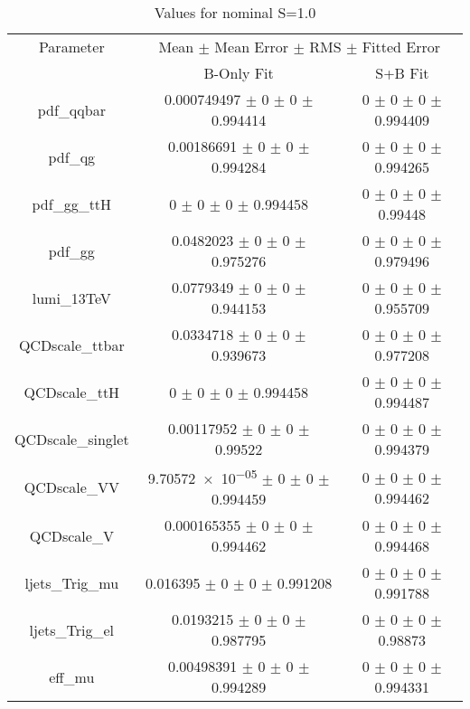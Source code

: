 \begin{table}
\centering
\caption{Values for nominal S=1.0}
\begin{tabular}{ccc}
\toprule
Parameter & \multicolumn{2}{c}{Mean $\pm$ Mean Error $\pm$ RMS $\pm$ Fitted Error}\\
 & B-Only Fit & S+B Fit\\
\midrule
pdf\_qqbar & \num{0.000749497} $\pm$ \num{0} $\pm$ \num{0} $\pm$ \num{0.994414} & \num{0} $\pm$ \num{0} $\pm$ \num{0} $\pm$ \num{0.994409}\\
pdf\_qg & \num{0.00186691} $\pm$ \num{0} $\pm$ \num{0} $\pm$ \num{0.994284} & \num{0} $\pm$ \num{0} $\pm$ \num{0} $\pm$ \num{0.994265}\\
pdf\_gg\_ttH & \num{0} $\pm$ \num{0} $\pm$ \num{0} $\pm$ \num{0.994458} & \num{0} $\pm$ \num{0} $\pm$ \num{0} $\pm$ \num{0.99448}\\
pdf\_gg & \num{0.0482023} $\pm$ \num{0} $\pm$ \num{0} $\pm$ \num{0.975276} & \num{0} $\pm$ \num{0} $\pm$ \num{0} $\pm$ \num{0.979496}\\
lumi\_13TeV & \num{0.0779349} $\pm$ \num{0} $\pm$ \num{0} $\pm$ \num{0.944153} & \num{0} $\pm$ \num{0} $\pm$ \num{0} $\pm$ \num{0.955709}\\
QCDscale\_ttbar & \num{0.0334718} $\pm$ \num{0} $\pm$ \num{0} $\pm$ \num{0.939673} & \num{0} $\pm$ \num{0} $\pm$ \num{0} $\pm$ \num{0.977208}\\
QCDscale\_ttH & \num{0} $\pm$ \num{0} $\pm$ \num{0} $\pm$ \num{0.994458} & \num{0} $\pm$ \num{0} $\pm$ \num{0} $\pm$ \num{0.994487}\\
QCDscale\_singlet & \num{0.00117952} $\pm$ \num{0} $\pm$ \num{0} $\pm$ \num{0.99522} & \num{0} $\pm$ \num{0} $\pm$ \num{0} $\pm$ \num{0.994379}\\
QCDscale\_VV & \num{9.70572e-05} $\pm$ \num{0} $\pm$ \num{0} $\pm$ \num{0.994459} & \num{0} $\pm$ \num{0} $\pm$ \num{0} $\pm$ \num{0.994462}\\
QCDscale\_V & \num{0.000165355} $\pm$ \num{0} $\pm$ \num{0} $\pm$ \num{0.994462} & \num{0} $\pm$ \num{0} $\pm$ \num{0} $\pm$ \num{0.994468}\\
ljets\_Trig\_mu & \num{0.016395} $\pm$ \num{0} $\pm$ \num{0} $\pm$ \num{0.991208} & \num{0} $\pm$ \num{0} $\pm$ \num{0} $\pm$ \num{0.991788}\\
ljets\_Trig\_el & \num{0.0193215} $\pm$ \num{0} $\pm$ \num{0} $\pm$ \num{0.987795} & \num{0} $\pm$ \num{0} $\pm$ \num{0} $\pm$ \num{0.98873}\\
eff\_mu & \num{0.00498391} $\pm$ \num{0} $\pm$ \num{0} $\pm$ \num{0.994289} & \num{0} $\pm$ \num{0} $\pm$ \num{0} $\pm$ \num{0.994331}\\

\end{tabular}
\end{table}
